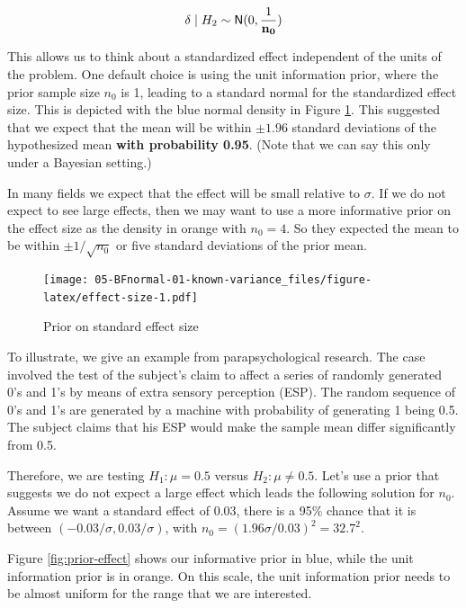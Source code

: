 \documentclass[]{book}
\theoremstyle{definition}
\theoremstyle{definition}
\theoremstyle{definition}
\theoremstyle{remark}
\let\BeginKnitrBlock\begin \let\EndKnitrBlock\end
\begin{document}
\[\delta \mid   H_2  \sim \textsf{N}(0, \frac{1}{\mathbf{n_0}})\]

This allows us to think about a standardized effect independent of the
units of the problem. One default choice is using the unit information
prior, where the prior sample size \(n_0\) is 1, leading to a standard
normal for the standardized effect size. This is depicted with the blue
normal density in Figure \ref{fig:effect-size}. This suggested that we
expect that the mean will be within \(\pm 1.96\) standard deviations of
the hypothesized mean \textbf{with probability 0.95}. (Note that we can
say this only under a Bayesian setting.)

In many fields we expect that the effect will be small relative to
\(\sigma\). If we do not expect to see large effects, then we may want
to use a more informative prior on the effect size as the density in
orange with \(n_0 = 4\). So they expected the mean to be within
\(\pm 1/\sqrt{n_0}\) or five standard deviations of the prior mean.

\begin{figure}[htbp]
\centering
\texttt{[image: 05-BFnormal-01-known-variance\_files/figure-latex/effect-size-1.pdf]}
\caption{\label{fig:effect-size}Prior on standard effect size}
\end{figure}

\BeginKnitrBlock{example}
\protect\hypertarget{exm:unnamed-chunk-2}{}\label{exm:unnamed-chunk-2} To
illustrate, we give an example from parapsychological research. The case
involved the test of the subject's claim to affect a series of randomly
generated 0's and 1's by means of extra sensory perception (ESP). The
random sequence of 0's and 1's are generated by a machine with
probability of generating 1 being 0.5. The subject claims that his ESP
would make the sample mean differ significantly from 0.5.
\EndKnitrBlock{example}

Therefore, we are testing \(H_1: \mu = 0.5\) versus
\(H_2: \mu \neq 0.5\). Let's use a prior that suggests we do not expect
a large effect which leads the following solution for \(n_0\). Assume we
want a standard effect of 0.03, there is a 95\% chance that it is
between \((-0.03/\sigma, 0.03/\sigma)\), with
\(n_0 = (1.96\sigma/0.03)^2 = 32.7^2\).

Figure \ref{fig:prior-effect} shows our informative prior in blue, while
the unit information prior is in orange. On this scale, the unit
information prior needs to be almost uniform for the range that we are
interested.
\end{document}
